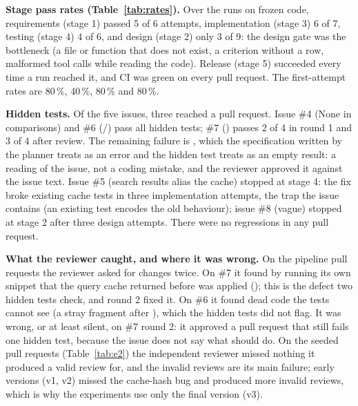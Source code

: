 \textbf{Stage pass rates (Table~\ref{tab:rates}).} Over the runs on frozen code, requirements (stage 1) passed 5 of 6 attempts, implementation (stage 3) 6 of 7, testing (stage 4) 4 of 6, and design (stage 2) only 3 of 9: the design gate was the bottleneck (a file or function that does not exist, a criterion without a row, malformed tool calls while reading the code). Release (stage 5) succeeded every time a run reached it, and CI was green on every pull request. The first-attempt rates are 80\,\%, 40\,\%, 80\,\% and 80\,\%.

\textbf{Hidden tests.} Of the five issues, three reached a pull request. Issue \#4 (None in comparisons) and \#6 (/) pass all hidden tests; \#7 () passes 2 of 4 in round 1 and 3 of 4 after review. The remaining failure is , which the specification written by the planner treats as an error and the hidden test treats as an empty result: a reading of the issue, not a coding mistake, and the reviewer approved it against the issue text. Issue \#5 (search results alias the cache) stopped at stage 4: the fix broke existing cache tests in three implementation attempts, the trap the issue contains (an existing test encodes the old behaviour); issue \#8 (vague) stopped at stage 2 after three design attempts. There were no regressions in any pull request.

\textbf{What the reviewer caught, and where it was wrong.} On the pipeline pull requests the reviewer asked for changes twice. On \#7 it found by running its own snippet that the query cache returned before  was applied (); this is the defect two hidden tests check, and round 2 fixed it. On \#6 it found dead code the tests cannot see (a stray fragment after ), which the hidden tests did not flag. It was wrong, or at least silent, on \#7 round 2: it approved a pull request that still fails one hidden test, because the issue does not say what  should do. On the seeded pull requests (Table~\ref{tab:e2}) the independent reviewer missed nothing it produced a valid review for, and the invalid reviews are its main failure; early versions (v1, v2) missed the cache-hash bug and produced more invalid reviews, which is why the experiments use only the final version (v3).

